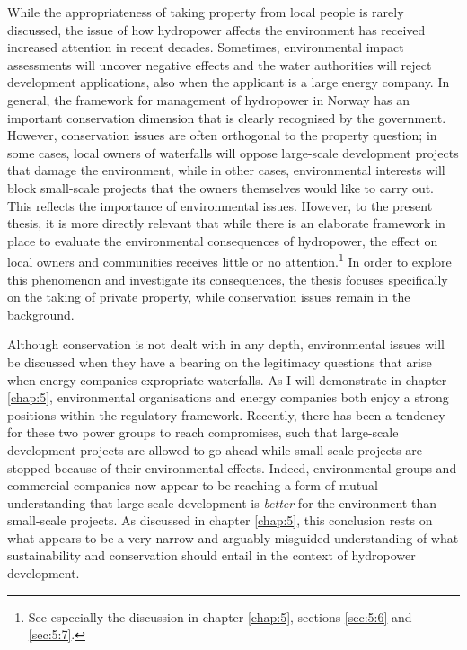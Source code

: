 While the appropriateness of taking property from local people is rarely discussed, the issue of how hydropower affects the environment has received increased attention in recent decades. Sometimes, environmental impact assessments will uncover negative effects and the water authorities will reject development applications, also when the applicant is a large energy company. In general, the framework for management of hydropower in Norway has an important conservation dimension that is clearly recognised by the government. However, conservation issues are often orthogonal to the property question; in some cases, local owners of waterfalls will oppose large-scale development projects that damage the environment, while in other cases, environmental interests will block small-scale projects that the owners themselves would like to carry out. This reflects the importance of environmental issues. However, to the present thesis, it is more directly relevant that while there is an elaborate framework in place to evaluate the environmental consequences of hydropower, the effect on local owners and communities receives little or no attention.\footnote{See especially the discussion in chapter \ref{chap:5}, sections \ref{sec:5:6} and \ref{sec:5:7}.} In order to explore this phenomenon and investigate its consequences, the thesis focuses specifically on the taking of private property, while conservation issues remain in the background. %

Although conservation is not dealt with in any depth, environmental issues will be discussed when they have a bearing on the legitimacy questions that arise when energy companies expropriate waterfalls. As I will demonstrate in chapter \ref{chap:5}, environmental organisations and energy companies both enjoy a strong positions within the regulatory framework. Recently, there has been a tendency for these two power groups to reach compromises, such that large-scale development projects are allowed to go ahead while small-scale projects are stopped because of their environmental effects. Indeed, environmental groups and commercial companies now appear to be reaching a form of mutual understanding that large-scale development is {\it better} for the environment than small-scale projects. As discussed in chapter \ref{chap:5}, this conclusion rests on what appears to be a very narrow and arguably misguided understanding of what sustainability and conservation should entail in the context of hydropower development. %

